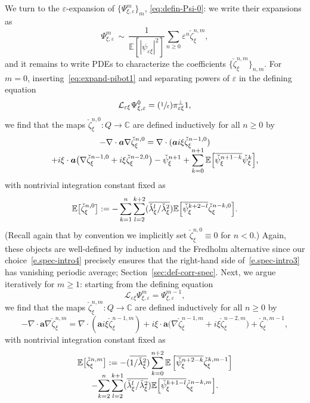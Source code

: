 \documentclass[JEP,XML,SOM,Unicode,published]{cedram}
\newcommand{\Psfrac}[2]{(\sfrac{#1}{#2})}
\theoremstyle{plain}
\theoremstyle{definition}
\numberwithin{equation}{section}
\newcommand{\e}{\varepsilon}
\newcommand{\Lc}{\mathcal{L}}
\newcommand{\C}{\mathbb C}
\newcommand{\Aa}{\boldsymbol a}
\newcommand{\expec}[1]{\mathbb{E}\left[ #1 \right]}
\newcommand{\Bexpec}[1]{\mathbb{E}\Bigl[ #1 \Bigr]}
\newcommand{\expecm}[1]{\mathbb{E}\bigl[ #1 \bigr]}\let\bexpec\expecm
\begin{document}
We turn to the $\e$-expansion of $\{\Psi_{\xi,\e}^m\}_m$, \cf \eqref{eq:defin-Psi-0}: we write their expansions as
\begin{equation}\label{eq:expand-Psixieps}
\Psi_{\xi,\e}^m\,\sim\,\frac1{\expec{|\psi_{\e\xi}|^2}}\sum_{n\ge0}\e^n\check\zeta_\xi^{n,m},
\end{equation}
and it remains to write PDEs to characterize the coefficients $\{\check\zeta_\xi^{n,m}\}_{n,m}$.
For $m=0$, inserting~\eqref{eq:expand-pibot1} and separating powers of $\e$ in the defining equation
\begin{equation*}
\Lc_{\e\xi} \Psi_{\xi,\e}^0=\Psfrac1\e\pi_{\e\xi}^\bot1,
\end{equation*}
we find that the maps $\check\zeta_\xi^{n,0}:Q\to\C$ are defined inductively for all $n\ge0$ by
\begin{multline}\label{e.spec-intro3}
-\nabla\cdot\Aa\nabla\check\zeta^{n,0}_\xi=\nabla\cdot(\Aa i\xi\check\zeta^{n-1,0}_\xi)\\[-5pt]+i\xi\cdot\Aa\big(\nabla\check\zeta^{n-1,0}_\xi+i\xi\check\zeta^{n-2,0}_\xi\big)-\check\psi^{n+1}_\xi+\sum_{k=0}^{n+1}\Bexpec{\overline{\check\psi^{n+1-k}_\xi}\check\psi^k_\xi},
\end{multline}
with nontrivial integration constant fixed as
\begin{equation}\label{e.spec-intro4}
\expecm{\check\zeta^{n,0}_\xi}:=-\sum_{k=1}^{n}\sum_{l=2}^{k+2}(\overline{\check\lambda^l_\xi/\check\lambda^2_\xi})\Bexpec{\overline{\check\psi^{k+2-l}_\xi} \check\zeta^{n-k,0}_\xi}.
\end{equation}
(Recall again that by convention we implicitly set $\check\zeta_\xi^{n,0}\equiv0$ for $n<0$.)
Again, these objects are well-defined by induction and the Fredholm alternative since our choice~\eqref{e.spec-intro4} precisely ensures that the right-hand side of~\eqref{e.spec-intro3} has vanishing periodic average; \cf Section~\ref{sec:def-corr-spec}.
Next, we argue iteratively for $m\ge1$:
starting from the defining equation
\[\Lc_{\e\xi}\Psi_{\xi,\e}^{m}= \Psi_{\xi,\e}^{m-1},\]
we find that the maps $\check\zeta_\xi^{n,m}:Q\to\C$ are defined inductively for all $n\ge0$ by
\begin{equation}\label{e.spec-intro4re}
-\nabla\cdot\Aa\nabla\check\zeta^{n,m}_\xi=\nabla\cdot(\Aa i\xi\check\zeta^{n-1,m}_\xi)+i\xi\cdot\Aa\big(\nabla\check\zeta^{n-1,m}_\xi+i\xi\check\zeta^{n-2,m}_\xi\big)+\check\zeta^{n,m-1}_\xi,
\end{equation}
with nontrivial integration constant fixed as
\begin{multline}\label{e.spec-intro5re}
\expecm{\check\zeta^{n,m}_\xi}:=-(\overline{1/\check\lambda^2_\xi})\sum_{k=0}^{n+2}\expec{\overline{\check\psi^{n+2-k}_\xi }\check\zeta^{k,m-1}_\xi}\\[-8pt]
-{\sum_{k=2}^{n}}\sum_{l=2}^{k+1}(\overline{\check\lambda^l_\xi/\check\lambda^2_\xi})\Bexpec{\overline{\check\psi^{k+1-l}_\xi }\check\zeta^{n-k,m}_\xi}.
\end{multline}
\end{document}
